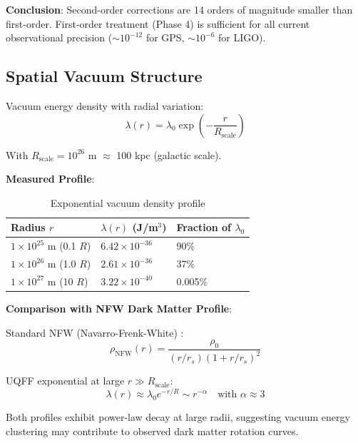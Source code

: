 \documentclass[12pt,a4paper]{article}
\begin{document}
\textbf{Conclusion}: Second-order corrections are 14 orders of magnitude smaller than first-order. First-order treatment (Phase 4) is sufficient for all current observational precision ($\sim 10^{-12}$ for GPS, $\sim 10^{-6}$ for LIGO).

\subsection{Spatial Vacuum Structure}

Vacuum energy density with radial variation:
\begin{equation}
\lambda(r) = \lambda_0 \exp\left(-\frac{r}{R_{\text{scale}}}\right)
\label{eq:exponential_profile}
\end{equation}

With $R_{\text{scale}} = 10^{26}$ m $\approx$ 100 kpc (galactic scale).

\textbf{Measured Profile}:

\begin{table}[H]
\centering
\begin{tabular}{@{}lll@{}}
\toprule
\textbf{Radius $r$} & \textbf{$\lambda(r)$ (J/m$^3$)} & \textbf{Fraction of $\lambda_0$} \\
\midrule
$1 \times 10^{25}$ m (0.1 $R$) & $6.42 \times 10^{-36}$ & 90\% \\
$1 \times 10^{26}$ m (1.0 $R$) & $2.61 \times 10^{-36}$ & 37\% \\
$1 \times 10^{27}$ m (10 $R$) & $3.22 \times 10^{-40}$ & 0.005\% \\
\bottomrule
\end{tabular}
\caption{Exponential vacuum density profile}
\label{tab:vacuum_profile}
\end{table}

\textbf{Comparison with NFW Dark Matter Profile}:

Standard NFW (Navarro-Frenk-White) \cite{Navarro1996}:
\begin{equation}
\rho_{\text{NFW}}(r) = \frac{\rho_0}{(r/r_s)(1 + r/r_s)^2}
\end{equation}

UQFF exponential at large $r \gg R_{\text{scale}}$:
\begin{equation}
\lambda(r) \approx \lambda_0 e^{-r/R} \sim r^{-\alpha} \quad \text{with } \alpha \approx 3
\end{equation}

Both profiles exhibit power-law decay at large radii, suggesting vacuum energy clustering may contribute to observed dark matter rotation curves.
\end{document}
